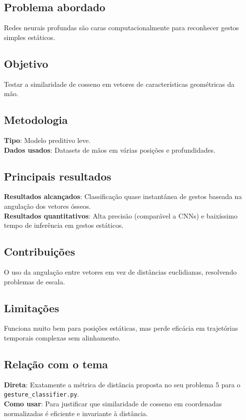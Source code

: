 \documentclass[12pt, a4paper]{article}
\begin{document}
\subsection{Problema abordado}
Redes neurais profundas são caras computacionalmente para reconhecer gestos simples estáticos.\\
\subsection{Objetivo}
Testar a similaridade de cosseno em vetores de características geométricas da mão.\\
\subsection{Metodologia}
\textbf{Tipo}: Modelo preditivo leve.\\
\textbf{Dados usados}: Datasets de mãos em várias posições e profundidades.\\
\subsection{Principais resultados}
\textbf{Resultados alcançados}: Classificação quase instantânea de gestos baseada na angulação dos vetores ósseos.\\
\textbf{Resultados quantitativos}: Alta precisão (comparável a CNNs) e baixíssimo tempo de inferência em gestos estáticos.\\
\subsection{Contribuições}
O uso da angulação entre vetores em vez de distâncias euclidianas, resolvendo problemas de escala.\\
\subsection{Limitações}
Funciona muito bem para posições estáticas, mas perde eficácia em trajetórias temporais complexas sem alinhamento.\\
\subsection{Relação com o tema}
\textbf{Direta}: Exatamente a métrica de distância proposta no seu problema 5 para o \texttt{gesture\_classifier.py}.\\
\textbf{Como usar}: Para justificar que similaridade de cosseno em coordenadas normalizadas é eficiente e invariante à distância.\\
\end{document}

